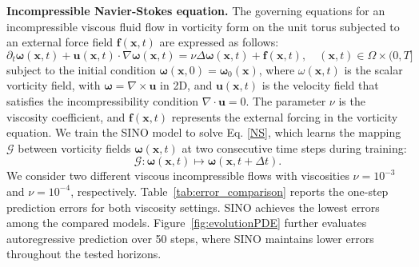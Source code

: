 \documentclass[preprint,numbers,sort&compress]{elsarticle}
\begin{document}
			
			\textbf{Incompressible Navier-Stokes equation.} The governing equations for an incompressible viscous fluid flow in vorticity form on the unit torus subjected to an external force field \( \boldsymbol{f}(\mathbf{x},t) \) are expressed as follows:
			\begin{equation}\label{NS}
				\partial_t \boldsymbol{\omega}(\mathbf{x},t) + \boldsymbol{u}(\mathbf{x},t)\cdot \nabla \boldsymbol{\omega}(\mathbf{x},t) 
				= \nu \Delta \boldsymbol{\omega}(\mathbf{x},t) + \boldsymbol{f}(\mathbf{x},t), \quad (\mathbf{x}, t) \in \Omega \times (0, T]
			\end{equation}
			subject to the initial condition \(\boldsymbol{\omega}(\mathbf{x},0) = \boldsymbol{\omega}_0(\mathbf{x})\), where \(\omega(\mathbf{x},t)\) is the scalar vorticity field, with \(\boldsymbol{\omega} = \nabla \times \boldsymbol{u}\) in 2D, and \(\boldsymbol{u}(\mathbf{x},t)\) is the velocity field that satisfies the incompressibility condition \(\nabla \cdot \boldsymbol{u} = 0\). The parameter \(\nu\) is the viscosity coefficient, and \(\boldsymbol{f}(\mathbf{x},t)\) represents the external forcing in the vorticity equation. 
			We train the SINO model to solve Eq. \eqref{NS}, which learns the mapping \(\mathcal{G}\) between vorticity fields \(\boldsymbol{\omega}(\mathbf{x}, t)\) at two consecutive time steps during training:
			\[
			\mathcal{G}: \boldsymbol{\omega}(\mathbf{x}, t) \mapsto \boldsymbol{\omega}(\mathbf{x}, t+\Delta t).
			\]
			We consider two different viscous incompressible flows with viscosities $\nu = 10^{-3}$ and $\nu = 10^{-4}$, respectively. 
			Table~\ref{tab:error_comparison} reports the one-step prediction errors for both
			viscosity settings. SINO achieves the lowest errors among
			the compared models. Figure~\ref{fig:evolutionPDE} further evaluates autoregressive
			prediction over 50 steps, where SINO maintains lower errors
			throughout the tested horizons.
			
\end{document}
